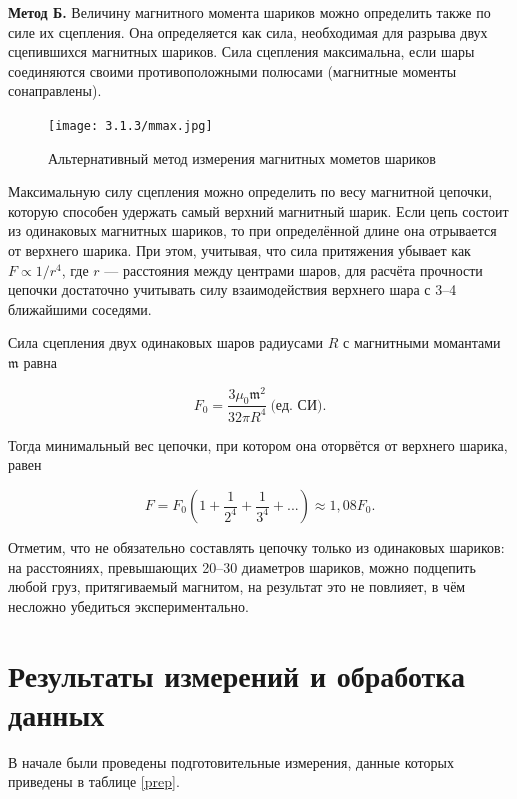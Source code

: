 \documentclass[a4paper,12pt]{article} %
\begin{document}
\textbf{Метод Б.} Величину магнитного момента шариков можно определить также по силе их сцепления. Она определяется как сила, необходимая для разрыва двух сцепившихся магнитных шариков. Сила сцепления максимальна, если шары соединяются своими противоположными полюсами (магнитные моменты сонаправлены).

\begin{figure}
\begin{center}
    \texttt{[image: 3.1.3/mmax.jpg]}
    \caption{Альтернативный метод измерения магнитных мометов шариков}
\end{center}
\end{figure}


Максимальную силу сцепления можно определить по весу магнитной цепочки, которую способен удержать самый верхний магнитный шарик. Если цепь состоит из одинаковых магнитных шариков, то при определённой длине она отрывается от верхнего шарика. При этом, учитывая, что сила притяжения убывает как $F \propto 1/r^4$, где $r$ — расстояния между центрами шаров, для расчёта прочности цепочки достаточно учитывать силу взаимодействия верхнего шара с 3–4 ближайшими соседями.

Сила сцепления двух одинаковых шаров радиусами $R$ с магнитными момантами $\mathfrak{m}$ равна 

\begin{equation*}
        F_0 = \frac{3 \mu_0 \mathfrak{m}^2}{32 \pi R^4}\  \text{(ед. СИ).}    
\end{equation*}

\hfill \break
Тогда минимальный вес цепочки, при котором она оторвётся от верхнего шарика, равен

\begin{equation*}
    F = F_0\left(1 + \frac{1}{2^4} + \frac{1}{3^4} + ... \right) \approx 1,08F_0.
\end{equation*}

\hfill \break
Отметим, что не обязательно составлять цепочку только из одинаковых шариков: на расстояниях, превышающих 20–30 диаметров шариков, можно подцепить любой груз, притягиваемый магнитом, на результат это не повлияет, в чём несложно убедиться экспериментально.

\section{Результаты измерений и обработка данных}

В начале были проведены подготовительные измерения, данные которых приведены в таблице \ref{prep}.
\end{document}
